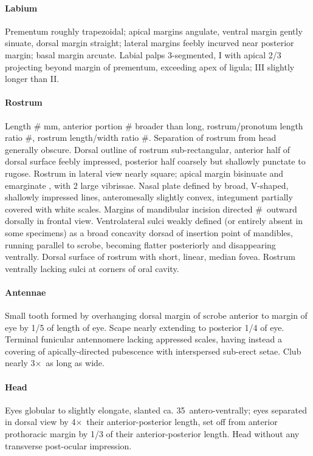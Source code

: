 \documentclass[fleqn,10pt,lineno]{wlpeerj} %
\newcommand{\td}{\textdegree~}
\newcommand{\x}{$\times$~}
\begin{document}
			\paragraph{Labium}
				Prementum roughly trapezoidal; apical margins angulate, ventral margin gently sinuate, dorsal margin straight; lateral margins feebly incurved near posterior margin; basal margin arcuate.
				Labial palps 3-segmented, I with apical 2/3 projecting beyond margin of prementum, exceeding apex of ligula; III slightly longer than II.
			\paragraph{Rostrum}
				Length \# mm, anterior portion \# broader than long, rostrum/pronotum length ratio \#, rostrum length/width ratio \#.
				Separation of rostrum from head generally obscure. 
				Dorsal outline of rostrum sub-rectangular, anterior half of dorsal surface feebly impressed, posterior half coarsely but shallowly punctate to rugose. 
				Rostrum in lateral view nearly square; apical margin bisinuate and emarginate , with 2 large vibrissae. 
				Nasal plate defined by broad, V-shaped, shallowly impressed lines, anteromesally slightly convex, integument partially covered with white scales. 
				Margins of mandibular incision directed \#\td outward dorsally in frontal view. 
				Ventrolateral sulci weakly defined (or entirely absent in some specimens) as a broad concavity dorsad of insertion point of mandibles, running parallel to scrobe, becoming flatter posteriorly and disappearing ventrally.
				Dorsal surface of rostrum with  short, linear, median fovea.
				Rostrum ventrally lacking sulci at corners of oral cavity.
			\paragraph{Antennae}
				Small tooth formed by overhanging dorsal margin of scrobe anterior to margin of eye by 1/5 of length of eye.
				Scape nearly extending to posterior 1/4 of eye.
				Terminal funicular antennomere lacking appressed scales, having instead a covering of apically-directed pubescence with interspersed sub-erect setae.
				Club nearly 3\x as long as wide.
			\paragraph{Head}
				Eyes globular to slightly elongate, slanted ca. 35\td antero-ventrally; eyes separated in dorsal view by 4\x their anterior-posterior length, set off from anterior prothoracic margin by 1/3 of their anterior-posterior length. 
				Head without any transverse post-ocular impression.
\end{document}
